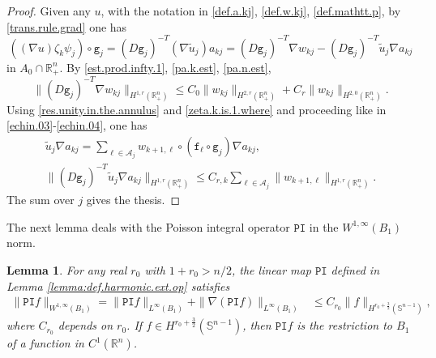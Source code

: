 \documentclass[10pt,reqno,a4paper]{article}
\numberwithin{equation}{section}
\theoremstyle{plain}
\newtheorem{lemma}[theorem]{Lemma}
\theoremstyle{definition}
\newcommand{\R}{{\mathbb R}}
\renewcommand{\S}{{\mathbb S}}
\newcommand{\mA}{\mathcal{A}}
\newcommand{\grad}{\nabla}
\begin{document}
\begin{proof}
Given any $u$, with the notation in \eqref{def.a.kj}, \eqref{def.w.kj}, \eqref{def.mathtt.p}, 
by \eqref{trans.rule.grad} one has 
\[
((\grad u) \zeta_k \psi_j) \circ \mathtt g_j 
= (D \mathtt g_j)^{-T} (\grad \tilde u_j) a_{kj}
= (D \mathtt g_j)^{-T} \grad w_{kj} 
- (D \mathtt g_j)^{-T} \tilde u_j \grad a_{kj} 
\]
in $A_0 \cap \R^n_+$. 
By \eqref{est.prod.infty.1}, 
\eqref{pa.k.est}, \eqref{pa.n.est},
\[
\| (D \mathtt g_j)^{-T} \grad w_{kj} \|_{H^{1,r}(\R^n_+)} 
\leq C_0 \| w_{kj} \|_{H^{2,r}(\R^n_+)} 
+ C_r \| w_{kj} \|_{H^{2,0}(\R^n_+)}.
\]
Using \eqref{res.unity.in.the.annulus} and \eqref{zeta.k.is.1.where} 
and proceeding like in \eqref{echin.03}-\eqref{echin.04}, one has 
\begin{gather*}
\tilde u_j \grad a_{kj} 
= \sum_{\ell \in \mA_j} w_{k+1, \ell} \circ (\mathtt f_\ell \circ \mathtt g_j) \grad a_{kj}, 
\\
\| (D \mathtt g_j)^{-T} \tilde u_j \grad a_{kj} \|_{H^{1,r}(\R^n_+)}
\leq C_{r,k} \sum_{\ell \in \mA_j} \| w_{k+1, \ell} \|_{H^{1,r}(\R^n_+)}.
\end{gather*}
The sum over $j$ gives the thesis.
\end{proof}


The next lemma deals with the Poisson integral operator $\mathtt{PI}$ 
in the $W^{1,\infty}(B_1)$ norm.  

\begin{lemma} \label{lemma:PI.infty}
For any real $r_0$ with $1+r_0 > n/2$, 
the linear map $\mathtt{PI}$ defined in Lemma \ref{lemma:def.harmonic.ext.op} satisfies 
\begin{align} 
\| \mathtt{PI} f \|_{W^{1,\infty}(B_1)} 
= \| \mathtt{PI} f \|_{L^\infty(B_1)} 
+ \| \grad(\mathtt{PI} f) \|_{L^\infty(B_1)} 
& \leq C_{r_0} \| f \|_{H^{r_0+\frac32}(\S^{n-1})},
\label{pinoli.L.infty.bound.PI}
\end{align}
where $C_{r_0}$ depends on $r_0$. 
If $f \in H^{r_0+\frac32}(\S^{n-1})$, 
then $\mathtt{PI} f$ is the restriction to $B_1$ of a function in $C^1(\R^n)$. 
\end{lemma}
\end{document}

